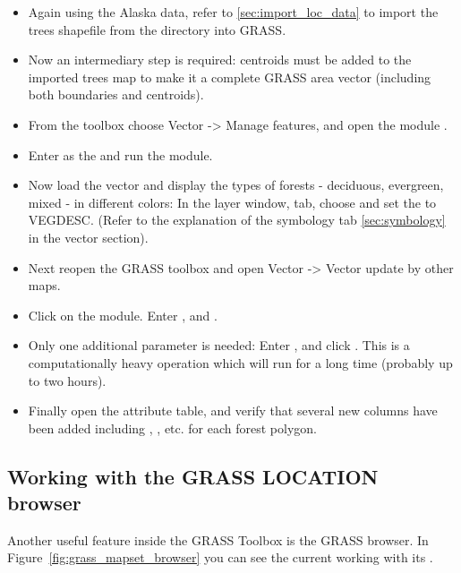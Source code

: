 \begin{itemize}[label=--]
\item Again using the Alaska data, refer to \ref{sec:import_loc_data} to
import the trees shapefile from the  directory
into GRASS. 
\item Now an intermediary step is required: centroids must be added to the
imported trees map to make it a complete GRASS area vector (including both
boundaries and centroids). 
\item From the toolbox choose Vector -> Manage features, and open the
module . 
\item Enter as the 
and run the module. 
\item Now load the  vector and display the types of
forests - deciduous, evergreen, mixed - in different colors: In the layer
 window,  tab, choose
 and set the
 to VEGDESC. (Refer to the
explanation of the symbology tab \ref{sec:symbology} in the vector section).
\item Next reopen the GRASS toolbox and open Vector -> Vector update by other
maps.
\item Click on the  module. Enter , and . 
\item Only one additional parameter is needed: Enter , and click . This is a computationally
heavy operation which will run for a long time (probably up to two hours).
\item Finally open the  attribute table, and verify
that several new columns have been added including ,
,  etc. for each forest polygon.
\end{itemize}

\subsection{Working with the GRASS LOCATION browser} 

Another useful feature inside the GRASS Toolbox is the GRASS 
 browser. In Figure~\ref{fig:grass_mapset_browser} you 
can see the current working  with its .

